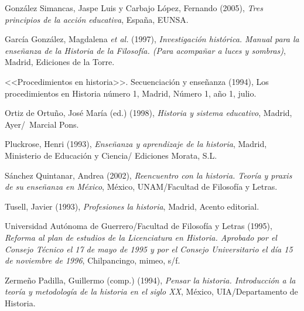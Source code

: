 González Simancas, Jaspe Luis y Carbajo 
López, Fernando (2005), \textit{Tres principios de la acción educativa}, España, EUNSA\@.

García González, Magdalena {\itshape et al\@.} (1997), 
\textit{Investigación histórica. Manual para la enseñanza de la 
Historia de la Filosofía. (Para acompañar a luces y sombras)}, Madrid, 
Ediciones de la Torre.

<<Procedimientos en historia>>. Secuenciación y enseñanza (1994), Los procedimientos en 
Historia número 1\@, Madrid, Número 1, año 1, julio.
 
Ortiz de Ortuño, José María (ed.) (1998), \textit{Historia y sistema 
educativo}, Madrid,  Ayer\slash\ Marcial Pons.

Pluckrose, Henri (1993), \textit{Enseñanza y aprendizaje de la 
historia}, Madrid, Ministerio de Educación y Ciencia/ Ediciones Morata, 
S.L.

Sánchez Quintanar, Andrea (2002), \textit{Reencuentro con la historia. 
Teoría y praxis de su enseñanza en México}, México, UNAM\slash{}Facultad de 
Filosofía y Letras. 

Tusell, Javier (1993), \textit{Profesiones la historia}, Madrid, Acento 
editorial.

Universidad Autónoma de Guerrero\slash{}Facultad de 
Filosofía y Letras (1995), \textit{Reforma al plan de estudios de la 
Licenciatura en Historia. Aprobado por el Consejo Técnico el 17 de mayo de 1995 
y por el Consejo Universitario el día 15 de noviembre de 1996}, Chilpancingo, mimeo, 
s\slash{}f.

Zermeño Padilla, Guillermo (comp.) (1994), 
\textit{Pensar la historia. Introducción a la 
teoría y metodología de la historia en el siglo XX}, México,\linebreak 
UIA\slash{}Departamento de Historia.



